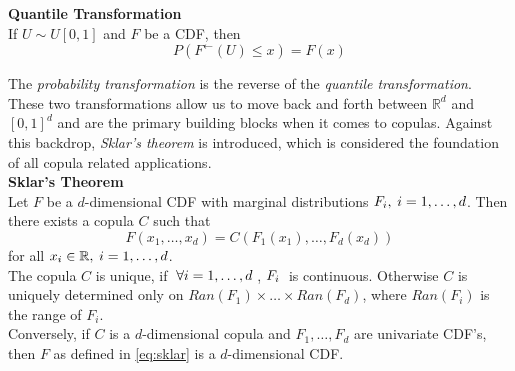 \textbf{Quantile Transformation}\\
If $U \sim U[0,1]$ and $F$ be a \ac{CDF}, then
\begin{equation}
P\left(F^{\leftarrow}(U) \leq x\right)=F(x)
\label{eq:quantile_transformation}
\end{equation}

The \textit{probability transformation} is the reverse of the \textit{quantile transformation}. These two transformations allow us to move back and forth between $\mathbb{R}^d$ and $[0,1]^d$ and are the primary building blocks when it comes to copulas. Against this backdrop, \textit{Sklar's theorem} is introduced, which is considered the foundation of all copula related applications.\\




\textbf{Sklar's Theorem} \citep{sklar1959fonctions} \\
Let $F$ be a $d$-dimensional \ac{CDF} with marginal distributions $F_{i}, \hspace{0.25em} i = 1, \ldots, d$.
Then there exists a copula $C$ such that
\begin{equation}
F(x_1, \ldots, x_d) = C (F_1(x_1), \ldots, F_d(x_d))
\label{eq:sklar}
\end{equation}
for all $x_i \in \mathbb{R}, \hspace{0.25em} i = 1, \ldots, d $.\\
The copula $C$ is unique, if $ \hspace{0.25em} \forall i = 1, \ldots, d \hspace{0.25em}$,  $F_i \hspace{0.25em}$  is continuous. Otherwise $C$ is uniquely determined only on
$Ran(F_1) \times \ldots \times Ran(F_d)$, where $Ran(F_{i})$ is the range of $F_i$.\\
Conversely, if $C$ is a $d$-dimensional copula and $F_1, \ldots, F_d$ are univariate \ac{CDF}'s, then $F$ as defined in \autoref{eq:sklar} is a 
$d$-dimensional \ac{CDF}.
\\

